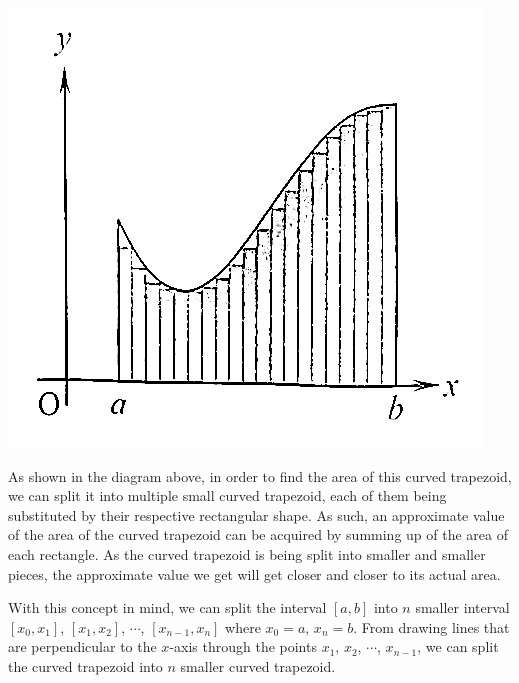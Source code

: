 \begin{center}
    \includegraphics[scale=0.3]{assets/28-4.jpg}
\end{center}

As shown in the diagram above, in order to find the area of this curved
trapezoid, we can split it into multiple small curved trapezoid, each of them
being substituted by their respective rectangular shape. As such, an
approximate value of the area of the curved trapezoid can be acquired by
summing up of the area of each rectangle. As the curved trapezoid is being
split into smaller and smaller pieces, the approximate value we get will get
closer and closer to its actual area.

With this concept in mind, we can split the interval $[a, b]$ into $n$ smaller
interval $[x_0, x_1]$, $[x_1, x_2]$, $\cdots$, $[x_{n-1}, x_n]$ where $x_0 =
    a$, $x_n = b$. From drawing lines that are perpendicular to the $x$-axis
through the points $x_1$, $x_2$, $\cdots$, $x_{n-1}$, we can split the curved
trapezoid into $n$ smaller curved trapezoid.

